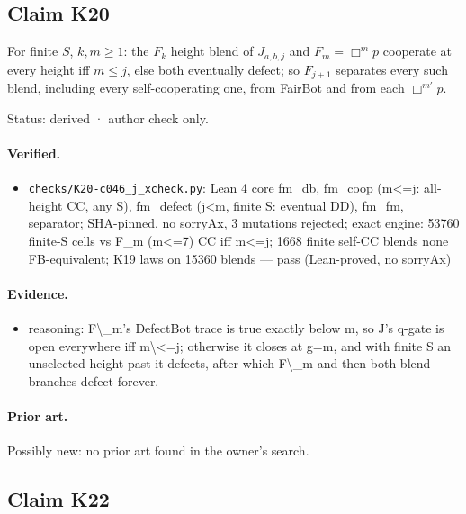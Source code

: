 \documentclass{article}
\begin{document}
\subsection*{Claim K20}

For finite $S$, $k,m\ge1$: the $F_k$ height blend of $J_{a,b,j}$ and $F_m=\Box^m p$ cooperate at every height iff $m\le j$, else both eventually defect; so $F_{j+1}$ separates every such blend, including every self-cooperating one, from FairBot and from each $\Box^{m'}p$.

Status: derived · author check only.

\paragraph{Verified.}
\begin{itemize}
\item \texttt{checks/K20-c046\_j\_xcheck.py}: Lean 4 core fm\_db, fm\_coop (m\textless{}=j: all-height CC, any S), fm\_defect (j\textless{}m, finite S: eventual DD), fm\_fm, separator; SHA-pinned, no sorryAx, 3 mutations rejected; exact engine: 53760 finite-S cells vs F\_m (m\textless{}=7) CC iff m\textless{}=j; 1668 finite self-CC blends none FB-equivalent; K19 laws on 15360 blends --- pass (Lean-proved, no sorryAx)
\end{itemize}

\paragraph{Evidence.}
\begin{itemize}
\item reasoning: F\textbackslash{}\_m's DefectBot trace is true exactly below m, so J's q-gate is open everywhere iff m\textbackslash{}\textless{}=j; otherwise it closes at g=m, and with finite S an unselected height past it defects, after which F\textbackslash{}\_m and then both blend branches defect forever.
\end{itemize}

\paragraph{Prior art.} Possibly new: no prior art found in the owner's search.

\subsection*{Claim K22}
\end{document}
